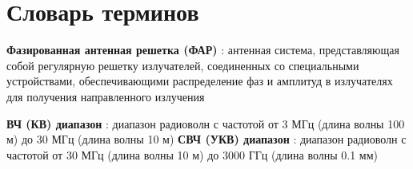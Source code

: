 \chapter*{Словарь терминов}             %

\textbf{Фазированная антенная решетка (ФАР)} : антенная система, представляющая собой регулярную решетку излучателей, соединенных со специальными устройствами, обеспечивающими распределение фаз и амплитуд в излучателях для получения направленного излучения

\textbf{ВЧ (КВ) диапазон} : диапазон радиоволн с частотой от 3 МГц (длина волны 100 м) до 30 МГц (длина волны 10 м)
\textbf{СВЧ (УКВ) диапазон} : диапазон радиоволн с частотой от 30 МГц (длина волны 10 м) до 3000 ГГц (длина волны 0.1 мм)
